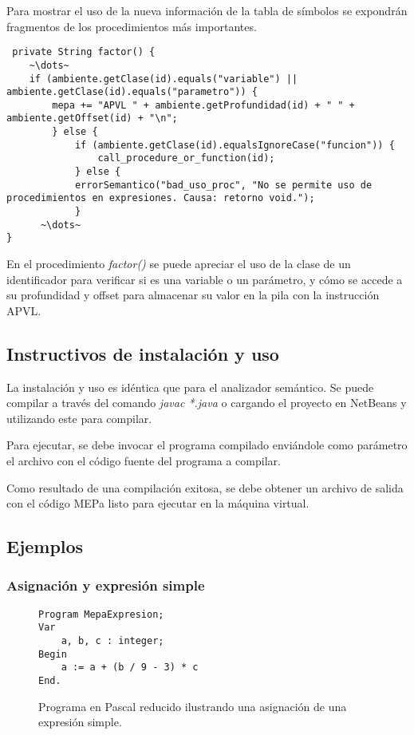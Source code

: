 Para mostrar el uso de la nueva información de la tabla de símbolos se expondrán fragmentos de los procedimientos más importantes.
\begin{verbatim}
 private String factor() {
    ~\dots~
    if (ambiente.getClase(id).equals("variable") || ambiente.getClase(id).equals("parametro")) {
        mepa += "APVL " + ambiente.getProfundidad(id) + " " + ambiente.getOffset(id) + "\n";
        } else {
            if (ambiente.getClase(id).equalsIgnoreCase("funcion")) {
                call_procedure_or_function(id);
            } else {
            errorSemantico("bad_uso_proc", "No se permite uso de procedimientos en expresiones. Causa: retorno void.");
            }
      ~\dots~
}
\end{verbatim}

En el procedimiento \emph{factor()} se puede apreciar el uso de la clase de un identificador para verificar si es una variable o un parámetro, y cómo se accede a su profundidad y offset para almacenar su valor en la pila con la instrucción APVL. 



\subsection{Instructivos de instalación y uso}
La instalación y uso es idéntica que para el analizador semántico. Se puede compilar a través del comando \emph{javac *.java} o cargando el proyecto en NetBeans y utilizando este para compilar.

Para ejecutar, se debe invocar el programa compilado enviándole como parámetro el archivo con el código fuente del programa a compilar. 

Como resultado de una compilación exitosa, se debe obtener un archivo de salida con el código MEPa listo para ejecutar en la máquina virtual.

\subsection{Ejemplos}

\subsubsection{Asignación y expresión simple}
\begin{figure}[H]
\begin{verbatim}
Program MepaExpresion;
Var
    a, b, c : integer;
Begin
    a := a + (b / 9 - 3) * c
End.
\end{verbatim}
\caption{Programa en Pascal reducido ilustrando una asignación de una expresión simple.}
\label{fig:ej_expresion}
\end{figure}

